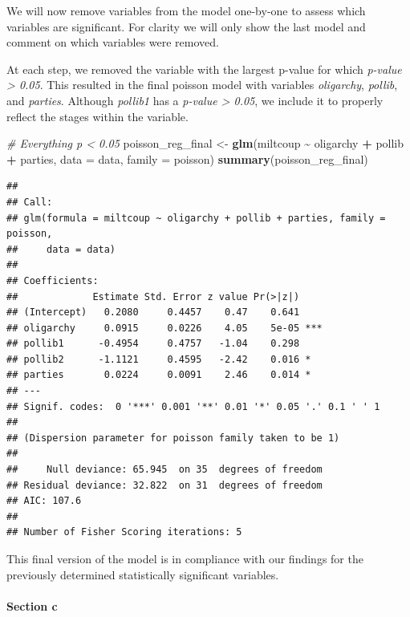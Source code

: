 \documentclass[
  11pt,
]{article}
\newenvironment{Shaded}{\begin{snugshade}}{\end{snugshade}}
\newcommand{\AttributeTok}[1]{\textcolor[rgb]{0.13,0.29,0.53}{#1}}
\newcommand{\CommentTok}[1]{\textcolor[rgb]{0.56,0.35,0.01}{\textit{#1}}}
\newcommand{\FunctionTok}[1]{\textcolor[rgb]{0.13,0.29,0.53}{\textbf{#1}}}
\newcommand{\NormalTok}[1]{#1}
\newcommand{\OtherTok}[1]{\textcolor[rgb]{0.56,0.35,0.01}{#1}}
\newcommand{\SpecialCharTok}[1]{\textcolor[rgb]{0.81,0.36,0.00}{\textbf{#1}}}
\begin{document}
We will now remove variables from the model one-by-one to assess which
variables are significant. For clarity we will only show the last model
and comment on which variables were removed.

At each step, we removed the variable with the largest p-value for which
\emph{p-value \textgreater{} 0.05}. This resulted in the final poisson
model with variables \emph{oligarchy}, \emph{pollib}, and
\emph{parties}. Although \emph{pollib1} has a \emph{p-value
\textgreater{} 0.05}, we include it to properly reflect the stages
within the variable.

\begin{Shaded}
\begin{Highlighting}[]
\CommentTok{\# Everything p \textless{} 0.05}
\NormalTok{poisson\_reg\_final }\OtherTok{\textless{}{-}} \FunctionTok{glm}\NormalTok{(miltcoup }\SpecialCharTok{\textasciitilde{}}\NormalTok{ oligarchy }\SpecialCharTok{+}\NormalTok{ pollib }\SpecialCharTok{+}\NormalTok{ parties, }
                    \AttributeTok{data =}\NormalTok{ data,}
                    \AttributeTok{family =}\NormalTok{ poisson)}
\FunctionTok{summary}\NormalTok{(poisson\_reg\_final)}
\end{Highlighting}
\end{Shaded}

\begin{verbatim}
## 
## Call:
## glm(formula = miltcoup ~ oligarchy + pollib + parties, family = poisson, 
##     data = data)
## 
## Coefficients:
##             Estimate Std. Error z value Pr(>|z|)    
## (Intercept)   0.2080     0.4457    0.47    0.641    
## oligarchy     0.0915     0.0226    4.05    5e-05 ***
## pollib1      -0.4954     0.4757   -1.04    0.298    
## pollib2      -1.1121     0.4595   -2.42    0.016 *  
## parties       0.0224     0.0091    2.46    0.014 *  
## ---
## Signif. codes:  0 '***' 0.001 '**' 0.01 '*' 0.05 '.' 0.1 ' ' 1
## 
## (Dispersion parameter for poisson family taken to be 1)
## 
##     Null deviance: 65.945  on 35  degrees of freedom
## Residual deviance: 32.822  on 31  degrees of freedom
## AIC: 107.6
## 
## Number of Fisher Scoring iterations: 5
\end{verbatim}

This final version of the model is in compliance with our findings for
the previously determined statistically significant variables.

\paragraph{Section c}\label{section-c-1}
\end{document}
